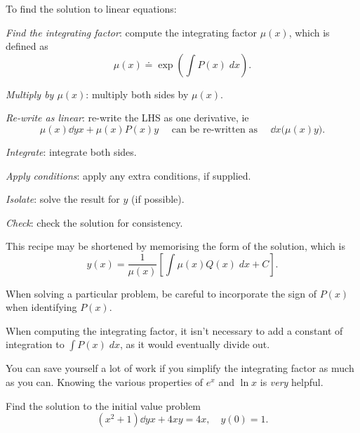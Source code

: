 \documentclass{book}
\begin{document}
To find the solution to linear equations:
\begin{enumerate*}
\item \emph{Find the integrating factor}: compute the integrating
  factor $\mu(x)$, which is defined as
  \begin{equation*}
    \mu(x) \doteq \exp \left( \int P(x) \;dx \right).
  \end{equation*}
\item \emph{Multiply by $\mu(x)$}: multiply both sides by $\mu(x)$.
\item \emph{Re-write as linear}: re-write the LHS as one derivative, ie
  \begin{equation*}
    \mu(x) \dd{y}{x} + \mu(x) P(x) y \quad \text{ can be re-written as } \quad \dd{}{x} \bigl( \mu(x) y \bigr).
  \end{equation*}
\item \emph{Integrate}: integrate both sides.
\item \emph{Apply conditions}: apply any extra conditions, if supplied.
\item \emph{Isolate}: solve the result for $y$ (if possible).
\item \emph{Check}: check the solution for consistency.
\end{enumerate*}

This recipe may be shortened by memorising the form of the solution,
which is
\begin{equation*}
  y(x) = \frac{1}{\mu(x)} \left[ \int \mu(x) Q(x) \;dx + C \right].
\end{equation*}

\begin{heads}
  When solving a particular problem, be careful to incorporate the
  sign of $P(x)$ when identifying $P(x)$. %
\end{heads}

\begin{heads}
  When computing the integrating factor, it isn't necessary to add a
  constant of integration to $\int P(x)\; dx$, as it would eventually
  divide out.
\end{heads}

\begin{heads}
  You can save yourself a lot of work if you simplify the integrating
  factor as much as you can.  Knowing the various properties of $e^x$
  and $\ln x$ is \emph{very} helpful.
\end{heads}

\newpage
\begin{example}
  Find the solution to the initial value problem
  \begin{equation*}
    (x^2 + 1) \dd{y}{x} + 4xy = 4x, \quad y(0) = 1.
  \end{equation*}
\end{example}
\end{document}
